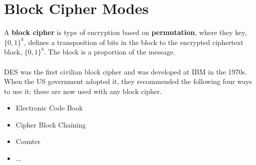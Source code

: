 
\section{Block Cipher Modes}\label{sec:blockciphermodes}
    A \textbf{block cipher} is type of encryption based on \textbf{permutation}, where they key, $\{0,1\}^k$, defines a transposition of bits in the block to the encrypted ciphertext block, $\{0,1\}^b$. The block is a proportion of the message.\\
    \\
    DES was the first civilian block cipher and was developed at IBM in the 1970s. When the US government adopted it, they recommended the following four ways to use it; these are now used with any block cipher.
    \begin{itemize}
        \item Electronic Code Book
        \item Cipher Block Chaining
        \item Counter
        \item ...
    \end{itemize}
    
